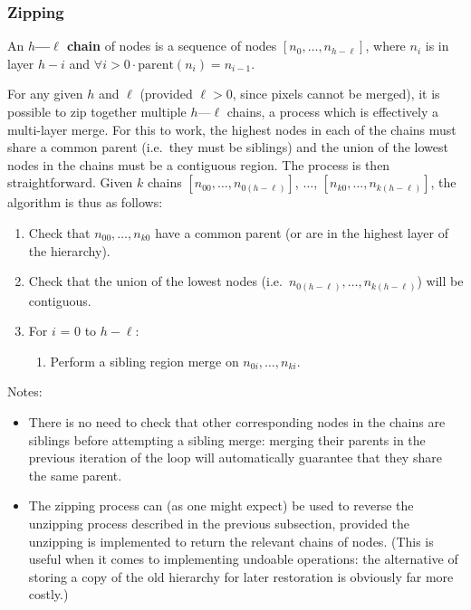 \subsubsection{Zipping}

\begin{definition}
An \textbf{$h$---$\ell$ chain} of nodes is a sequence of nodes $[n_0,\ldots,n_{h-\ell}]$, where $n_i$ is in layer $h-i$ and $\forall i > 0 \cdot \mbox{parent}(n_i) = n_{i-1}$.
\end{definition}

For any given $h$ and $\ell$ (provided $\ell > 0$, since pixels cannot be merged), it is possible to zip together multiple $h$---$\ell$ chains, a process which is effectively a multi-layer merge. For this to work, the highest nodes in each of the chains must share a common parent (i.e.~they must be siblings) and the union of the lowest nodes in the chains must be a contiguous region. The process is then straightforward. Given $k$ chains $[n_{00},\ldots,n_{0(h-\ell)}]$, $\ldots$, $[n_{k0},\ldots,n_{k(h-\ell)}]$, the algorithm is thus as follows:

\begin{enumerate}

\item Check that $n_{00}, \ldots, n_{k0}$ have a common parent (or are in the highest layer of the hierarchy).

\item Check that the union of the lowest nodes (i.e.~$n_{0(h-\ell)}, \ldots, n_{k(h-\ell)}$) will be contiguous.

\item For $i$ = $0$ to $h - \ell$:

\begin{enumerate}
\item Perform a sibling region merge on $n_{0i}, \ldots, n_{ki}$.
\end{enumerate}

\end{enumerate}

\noindent Notes:

\begin{itemize}

\item There is no need to check that other corresponding nodes in the chains are siblings before attempting a sibling merge: merging their parents in the previous iteration of the loop will automatically guarantee that they share the same parent.

\item The zipping process can (as one might expect) be used to reverse the unzipping process described in the previous subsection, provided the unzipping is implemented to return the relevant chains of nodes. (This is useful when it comes to implementing undoable operations: the alternative of storing a copy of the old hierarchy for later restoration is obviously far more costly.)

\end{itemize}

